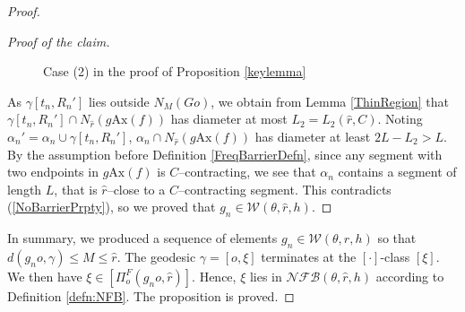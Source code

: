 \documentclass{amsart}
\theoremstyle{definition}
\theoremstyle{remark}
\newcommand{\ax}{\mathrm{Ax}}
\begin{document}
\begin{proof}
\begin{proof}[Proof of the claim]
\begin{figure}[h]
    \caption{Case (2) in the proof of Proposition \ref{keylemma}}
    \label{fig:extending}
\end{figure}

As  $\gamma[t_n, R_n']$  lies outside $N_M(Go)$, we obtain from Lemma \ref{ThinRegion} that $\gamma[t_n, R_n']\cap N_{\hat r}(g\ax(f))$ has diameter at most $L_2=L_2(\hat r,C)$. Noting $\alpha_n'=\alpha_n\cup \gamma[t_n, R_n']$, $\alpha_n\cap N_{\hat r}(g\ax(f))$ has diameter at least $2L-L_2>L$. By the assumption before Definition \ref{FreqBarrierDefn}, since any segment with two endpoints in $g\ax(f)$ is $C$--contracting, we see that $\alpha_n$ contains a segment of length $L$, that is $\hat r$–close to a $C$--contracting segment. This  contradicts  (\ref{NoBarrierPrpty}), so we proved that $g_n\in \mathcal{W}(\theta,\hat r,h)$.
\end{proof}

In summary, we produced a sequence of elements $g_n\in \mathcal{W}(\theta,\hat r,h)$ so that $d(g_no, \gamma)\le M\le \hat r$. The geodesic $\gamma=[o,\xi]$ terminates at the $[\cdot]$-class $[\xi]$. We then have $\xi\in [\Pi_{o}^F(g_no,\hat r)]$. Hence,  $\xi$ lies in $\mathcal{NFB}(\theta,\hat r, h)$ according to Definition \ref{defn:NFB}.  The proposition is proved.
\end{proof}
\end{document}
